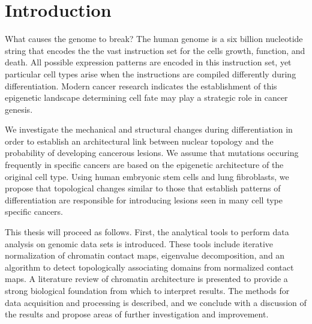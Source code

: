 
\chapter{Introduction}

What causes the genome to break?  The human genome is a six billion nucleotide string that encodes the
the vast instruction set for the cells growth, function, and death.  All possible expression patterns are
encoded in this instruction set, yet particular cell types arise when the instructions are compiled differently
during differentiation.  Modern cancer research indicates the establishment of this epigenetic landscape
determining cell fate may play a strategic role in cancer genesis.

We investigate the mechanical and structural changes during differentiation in order to establish an
architectural link between nuclear topology and the probability of developing cancerous lesions.  We
assume that mutations occuring frequently in specific cancers are based on the epigenetic architecture
of the original cell type.  Using human embryonic stem cells and lung fibroblasts, we propose that
topological changes similar to those that establish patterns of differentiation are responsible for
introducing lesions seen in many cell type specific cancers.

This thesis will proceed as follows.  First, the analytical tools to perform data analysis on genomic
data sets is introduced.  These tools include iterative normalization of chromatin contact maps, eigenvalue
decomposition, and an algorithm to detect topologically associating domains from normalized contact maps.
A literature review of chromatin architecture is presented to provide a strong biological foundation from which
to interpret results.  The methods for data acquisition and processing is described, and we conclude with a
discussion of the results and propose areas of further investigation and improvement.
